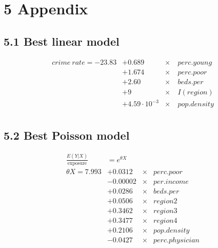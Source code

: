 \documentclass[oneside,11pt]{homework}
\begin{document}
\newpage

\section*{5 Appendix}
\subsection*{5.1 Best linear model}
\begin{equation}
\begin{aligned}
crime~rate =  -23.83 &+ 0.689&\times &~perc.young \\
&+1.674&\times &~perc.poor\\
&+2.60&\times &~beds.per \\
&+9&\times &~I(region) \\
&+4.59\cdot10^{-3}&\times &~pop.density\\
\end{aligned}
\end{equation}

\subsection*{5.2 Best Poisson model}
\begin{equation}
\begin{aligned}
\frac{E(Y|X)}{\text{exposure}} &= e^{\theta X}&&\\
\theta X =  7.993
                  &+ 0.0312 &\times &perc.poor\\
                  &-0.00002 &\times &per.income\\
                  &+ 0.0286 &\times &beds.per \\
                  &+0.0506  &\times &region 2 \\
                  &+0.3462  &\times &region 3 \\
                  &+0.3477  &\times &region 4 \\
                  &+ 0.2106 &\times &pop.density\\
                  &-0.0427 &\times &perc.physician\\
\end{aligned}
\end{equation}
\end{document}
